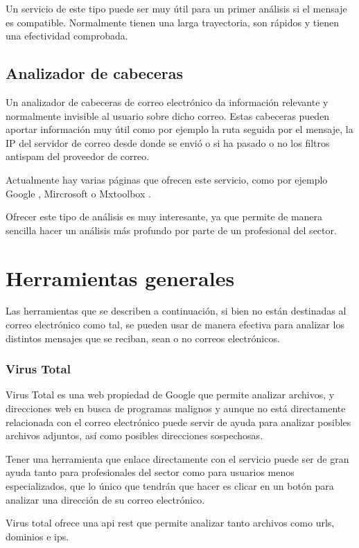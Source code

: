 Un servicio de este tipo puede ser muy útil para un primer análisis si el mensaje es compatible. Normalmente tienen una larga trayectoria, son rápidos y tienen una efectividad comprobada.

\subsection{Analizador de cabeceras}
Un analizador de cabeceras de correo electrónico da información relevante y normalmente invisible al usuario sobre dicho correo. Estas cabeceras pueden aportar información muy útil como por ejemplo la ruta seguida por el mensaje, la IP del servidor de correo desde donde se envió o si ha pasado o no los filtros antispam del proveedor de correo. 

Actualmente hay varias páginas que ofrecen este servicio, como por ejemplo Google \cite{header_google_analyzer}, Mircrosoft \cite{header_microsoft_analyzer} o Mxtoolbox \cite{header_mxtoolbox_analyzer}.

Ofrecer este tipo de análisis es muy interesante, ya que permite de manera sencilla hacer un análisis más profundo por parte de un profesional del sector.

\section{Herramientas generales}
Las herramientas que se describen a continuación, si bien no están destinadas al correo electrónico como tal, se pueden usar de manera efectiva para analizar los distintos mensajes que se reciban, sean o no correos electrónicos. 

\subsubsection{Virus Total} 
Virus Total \cite{virus_total} es una web propiedad de Google que permite analizar archivos, y direcciones web en busca de programas malignos y aunque no está directamente relacionada con el correo electrónico puede servir de ayuda para analizar posibles archivos adjuntos, así como posibles direcciones sospechosas.

Tener una herramienta que enlace directamente con el servicio puede ser de gran ayuda tanto para profesionales del sector como para usuarios menos especializados, que lo único que tendrán que hacer es clicar en un botón para analizar una dirección de su correo electrónico. 

Virus total ofrece una api rest que permite analizar tanto archivos como urls, dominios e ips.\cite{virus_total_api}

